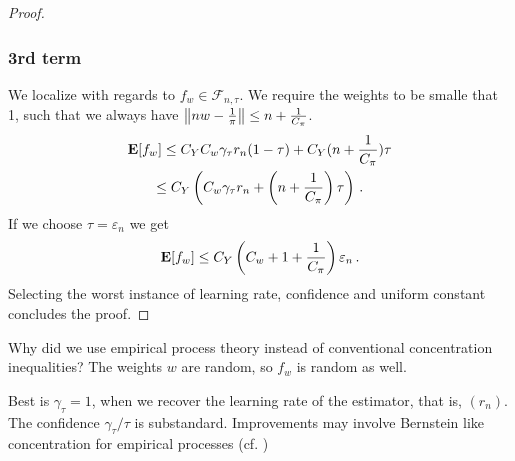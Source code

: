 \begin{proof}
\subsubsection*{3rd term}
We localize with regards to 
$
f_w \in \mathcal{F}_{n,\tau}
.
$
We require the weights to be smalle that 1, such that 
we always have
$
\left\lVert nw-  \frac{1}{\pi}\right\rVert
\le
n + \frac{1}{C_\pi}
$.
\begin{gather}
  \mathbf{E}[f_w]
  \le
  C_Y 
  C_w
  \gamma_\tau
  r_n
  (1-\tau)
  +
  C_Y
  (
n + \frac{1}{C_\pi}
  )
  \tau
  \\
  \le
  C_Y
  \left( 
  C_w
  \gamma_\tau
  r_n
  +
  \left(
n + \frac{1}{C_\pi}
  \right)
  \tau
  \right)
  \,.
\end{gather}
If we choose  $\tau=\varepsilon_n$
we get
\begin{gather}
  \mathbf{E}[f_w]
  \le
  C_Y
  \left( 
C_w+1+ \frac{1}{C_\pi}
  \right)
  \varepsilon_n
  \,.
\end{gather}
Selecting the worst instance of learning rate, confidence and uniform constant concludes the proof.

\end{proof}

\begin{reflection*}
  Why did we use empirical process theory instead of conventional concentration inequalities?
  The weights $w$ are random, so $f_w$ is random as well. 


Best is $\gamma_\tau=1$, when we recover the learning rate of the estimator, that is, $(r_n)$.
The confidence $\gamma_\tau/\tau$ is substandard. Improvements may involve Bernstein like concentration for empirical processes (cf. \cite[Section~2.14.2]{vaart2013})
\end{reflection*}

